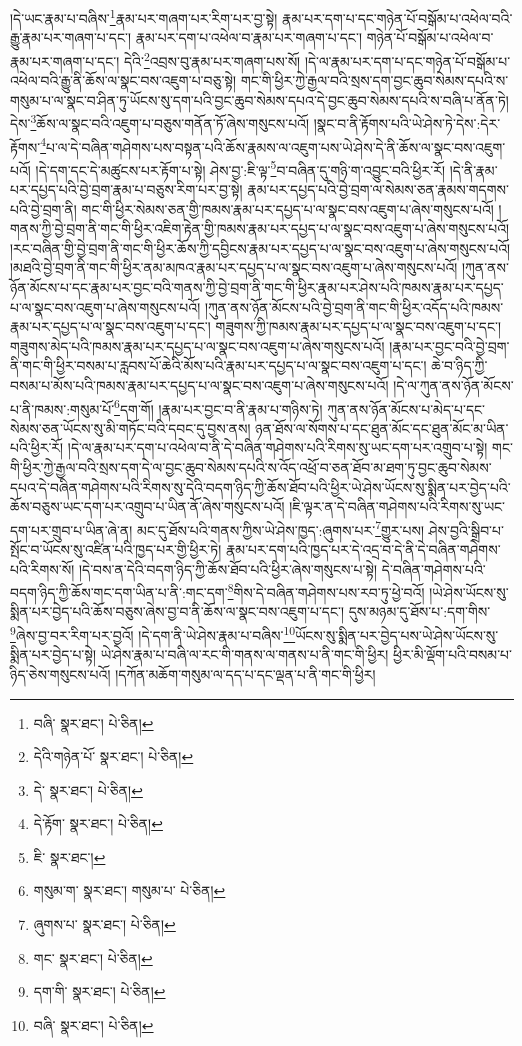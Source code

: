 །དེ་ཡང་རྣམ་པ་བཞིས་\footnote{བཞི་  སྣར་ཐང་།  པེ་ཅིན། }རྣམ་པར་གཞག་པར་རིག་པར་བྱ་སྟེ། རྣམ་པར་དག་པ་དང་གཉེན་པོ་བསྒོམ་པ་འཕེལ་བའི་རྒྱུ་རྣམ་པར་གཞག་པ་དང་། རྣམ་པར་དག་པ་འཕེལ་བ་རྣམ་པར་གཞག་པ་དང་། གཉེན་པོ་བསྒོམ་པ་འཕེལ་བ་རྣམ་པར་གཞག་པ་དང་། དེའི་\footnote{དེའི་གཉེན་པོ་  སྣར་ཐང་།  པེ་ཅིན། }འབྲས་བུ་རྣམ་པར་གཞག་པས་སོ། །དེ་ལ་རྣམ་པར་དག་པ་དང་གཉེན་པོ་བསྒོམ་པ་འཕེལ་བའི་རྒྱུ་ནི་ཆོས་ལ་སྣང་བས་འཇུག་པ་བཅུ་སྟེ། གང་གི་ཕྱིར་ཀྱེ་རྒྱལ་བའི་སྲས་དག་བྱང་ཆུབ་སེམས་དཔའི་ས་གསུམ་པ་ལ་སྣང་བ་ཤིན་ཏུ་ཡོངས་སུ་དག་པའི་བྱང་ཆུབ་སེམས་དཔའ་དེ་བྱང་ཆུབ་སེམས་དཔའི་ས་བཞི་པ་ནོན་ཏེ། དེས་\footnote{དེ་  སྣར་ཐང་།  པེ་ཅིན། }ཆོས་ལ་སྣང་བའི་འཇུག་པ་བཅུས་གནོན་ཏོ་ཞེས་གསུངས་པའོ། །སྣང་བ་ནི་རྟོགས་པའི་ཡེ་ཤེས་ཏེ་དེས་:དེར་རྟོགས་\footnote{དེ་རྟོག་  སྣར་ཐང་།  པེ་ཅིན། }པ་ལ་དེ་བཞིན་གཤེགས་པས་བསྟན་པའི་ཆོས་རྣམས་ལ་འཇུག་པས་ཡེ་ཤེས་དེ་ནི་ཆོས་ལ་སྣང་བས་འཇུག་པའོ། །དེ་དག་དང་དེ་མཚུངས་པར་རྟོག་པ་སྟེ། ཤེས་བྱ་:ཇི་ལྟ་\footnote{ཇི་  སྣར་ཐང་། }བ་བཞིན་དུ་གཉི་ག་འབྱུང་བའི་ཕྱིར་རོ། །དེ་ནི་རྣམ་པར་དཔྱད་པའི་བྱེ་བྲག་རྣམ་པ་བཅུས་རིག་པར་བྱ་སྟེ། རྣམ་པར་དཔྱད་པའི་བྱེ་བྲག་ལ་སེམས་ཅན་རྣམས་གདགས་པའི་བྱེ་བྲག་ནི། གང་གི་ཕྱིར་སེམས་ཅན་གྱི་ཁམས་རྣམ་པར་དཔྱད་པ་ལ་སྣང་བས་འཇུག་པ་ཞེས་གསུངས་པའོ། །གནས་ཀྱི་བྱེ་བྲག་ནི་གང་གི་ཕྱིར་འཇིག་རྟེན་གྱི་ཁམས་རྣམ་པར་དཔྱད་པ་ལ་སྣང་བས་འཇུག་པ་ཞེས་གསུངས་པའོ། །རང་བཞིན་གྱི་བྱེ་བྲག་ནི་གང་གི་ཕྱིར་ཆོས་ཀྱི་དབྱིངས་རྣམ་པར་དཔྱད་པ་ལ་སྣང་བས་འཇུག་པ་ཞེས་གསུངས་པའོ། །མཐའི་བྱེ་བྲག་ནི་གང་གི་ཕྱིར་ནམ་མཁའ་རྣམ་པར་དཔྱད་པ་ལ་སྣང་བས་འཇུག་པ་ཞེས་གསུངས་པའོ། །ཀུན་ནས་ཉོན་མོངས་པ་དང་རྣམ་པར་བྱང་བའི་གནས་ཀྱི་བྱེ་བྲག་ནི་གང་གི་ཕྱིར་རྣམ་པར་ཤེས་པའི་ཁམས་རྣམ་པར་དཔྱད་པ་ལ་སྣང་བས་འཇུག་པ་ཞེས་གསུངས་པའོ། །ཀུན་ནས་ཉོན་མོངས་པའི་བྱེ་བྲག་ནི་གང་གི་ཕྱིར་འདོད་པའི་ཁམས་རྣམ་པར་དཔྱད་པ་ལ་སྣང་བས་འཇུག་པ་དང་། གཟུགས་ཀྱི་ཁམས་རྣམ་པར་དཔྱད་པ་ལ་སྣང་བས་འཇུག་པ་དང་། གཟུགས་མེད་པའི་ཁམས་རྣམ་པར་དཔྱད་པ་ལ་སྣང་བས་འཇུག་པ་ཞེས་གསུངས་པའོ། །རྣམ་པར་བྱང་བའི་བྱེ་བྲག་ནི་གང་གི་ཕྱིར་བསམ་པ་རླབས་པོ་ཆེའི་མོས་པའི་རྣམ་པར་དཔྱད་པ་ལ་སྣང་བས་འཇུག་པ་དང་། ཆེ་བ་ཉིད་ཀྱི་བསམ་པ་མོས་པའི་ཁམས་རྣམ་པར་དཔྱད་པ་ལ་སྣང་བས་འཇུག་པ་ཞེས་གསུངས་པའོ། །དེ་ལ་ཀུན་ནས་ཉོན་མོངས་པ་ནི་ཁམས་:གསུམ་པོ་\footnote{གསུམ་ག་  སྣར་ཐང་། གསུམ་པ་  པེ་ཅིན། }དག་གོ། །རྣམ་པར་བྱང་བ་ནི་རྣམ་པ་གཉིས་ཏེ། ཀུན་ནས་ཉོན་མོངས་པ་མེད་པ་དང་སེམས་ཅན་ཡོངས་སུ་མི་གཏོང་བའི་དབང་དུ་བྱས་ནས། ཉན་ཐོས་ལ་སོགས་པ་དང་ཐུན་མོང་དང་ཐུན་མོང་མ་ཡིན་པའི་ཕྱིར་རོ། །དེ་ལ་རྣམ་པར་དག་པ་འཕེལ་བ་ནི་དེ་བཞིན་གཤེགས་པའི་རིགས་སུ་ཡང་དག་པར་འགྲུབ་པ་སྟེ། གང་གི་ཕྱིར་ཀྱེ་རྒྱལ་བའི་སྲས་དག་དེ་ལ་བྱང་ཆུབ་སེམས་དཔའི་ས་འོད་འཕྲོ་བ་ཅན་ཐོབ་མ་ཐག་ཏུ་བྱང་ཆུབ་སེམས་དཔའ་དེ་བཞིན་གཤེགས་པའི་རིགས་སུ་དེའི་བདག་ཉིད་ཀྱི་ཆོས་ཐོབ་པའི་ཕྱིར་ཡེ་ཤེས་ཡོངས་སུ་སྨིན་པར་བྱེད་པའི་ཆོས་བཅུས་ཡང་དག་པར་འགྲུབ་པ་ཡིན་ནོ་ཞེས་གསུངས་པའོ། །ཇི་ལྟར་ན་དེ་བཞིན་གཤེགས་པའི་རིགས་སུ་ཡང་དག་པར་གྲུབ་པ་ཡིན་ཞེ་ན། མང་དུ་ཐོས་པའི་གནས་ཀྱིས་ཡེ་ཤེས་ཁྱད་:ཞུགས་པར་\footnote{ཞུགས་པ་  སྣར་ཐང་།  པེ་ཅིན། }གྱུར་པས། ཤེས་བྱའི་སྒྲིབ་པ་སྤོང་བ་ཡོངས་སུ་འཛིན་པའི་ཁྱད་པར་གྱི་ཕྱིར་ཏེ། རྣམ་པར་དག་པའི་ཁྱད་པར་དེ་འདྲ་བ་དེ་ནི་དེ་བཞིན་གཤེགས་པའི་རིགས་སོ། །དེ་བས་ན་དེའི་བདག་ཉིད་ཀྱི་ཆོས་ཐོབ་པའི་ཕྱིར་ཞེས་གསུངས་པ་སྟེ། དེ་བཞིན་གཤེགས་པའི་བདག་ཉིད་ཀྱི་ཆོས་གང་དག་ཡིན་པ་ནི་:གང་དག་\footnote{གང་  སྣར་ཐང་།  པེ་ཅིན། }གིས་དེ་བཞིན་གཤེགས་པས་རབ་ཏུ་ཕྱེ་བའོ། །ཡེ་ཤེས་ཡོངས་སུ་སྨིན་པར་བྱེད་པའི་ཆོས་བཅུས་ཞེས་བྱ་བ་ནི་ཆོས་ལ་སྣང་བས་འཇུག་པ་དང་། དུས་མཉམ་དུ་ཐོས་པ་:དག་གིས་\footnote{དག་གི་  སྣར་ཐང་།  པེ་ཅིན། }ཞེས་བྱ་བར་རིག་པར་བྱའོ། །དེ་དག་ནི་ཡེ་ཤེས་རྣམ་པ་བཞིས་\footnote{བཞི་  སྣར་ཐང་།  པེ་ཅིན། }ཡོངས་སུ་སྨིན་པར་བྱེད་པས་ཡེ་ཤེས་ཡོངས་སུ་སྨིན་པར་བྱེད་པ་སྟེ། ཡེ་ཤེས་རྣམ་པ་བཞི་ལ་རང་གི་གནས་ལ་གནས་པ་ནི་གང་གི་ཕྱིར། ཕྱིར་མི་ལྡོག་པའི་བསམ་པ་ཉིད་ཅེས་གསུངས་པའོ། །དཀོན་མཆོག་གསུམ་ལ་དད་པ་དང་ལྡན་པ་ནི་གང་གི་ཕྱིར། 